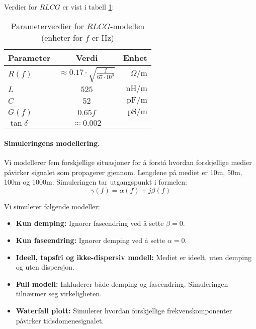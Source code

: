 \noindent Verdier for $RLCG$ er vist i tabell \ref{tab:parameters}: \\
\begin{table}[htbp] %
    \centering %
    
    \label{tab:my_table} %

    \begin{tabular}{l c r} %
        \toprule %
        Parameter & Verdi & Enhet\\ %
        \midrule %
         $R(f)$ & $\approx 0.17 \cdot \sqrt{\frac{f}{67 \cdot 10^3}}$ &  $\Omega / \mathrm{m}$ \\[.3em]
         $L$ & $525$ & $\mathrm{nH/m}$ \\[.3em]
         $C$ & $52$ & $\mathrm{pF/m}$ \\[.3em]
         $G(f)$ & $0.65f$ &  $\mathrm{pS/m}$ \\[.3em]
         $\tan \delta$ & $\approx 0.002$ &  $--$ \\[.3em]
        \bottomrule %
    \end{tabular}
    \caption{Parameterverdier for $RLCG$-modellen (enheter for $f$ er Hz)} %
    \label{tab:parameters} %
\end{table}
\paragraph{Simuleringens modellering.}
Vi modellerer fem forskjellige situasjoner for å forstå hvordan forskjellige medier påvirker signalet som propagerer gjennom. Lengdene på mediet er 10m, 50m, 100m og 1000m. Simuleringen tar utgangspunkt i formelen:
\[
\gamma (f) = \alpha(f) + j\beta(f)
\]

\noindent Vi simulerer følgende modeller:\\
\begin{itemize}
    \item \textbf{Kun demping:} Ignorer faseendring ved å sette $\beta = 0$.\\
    \item \textbf{Kun faseendring:} Ignorer demping ved å sette $\alpha = 0$.\\
    \item \textbf{Ideell, tapsfri og ikke-dispersiv modell:} Mediet er ideelt, uten demping og uten dispersjon.\\
    \item \textbf{Full modell:} Inkluderer både demping og faseendring. Simuleringen tilnærmer seg virkeligheten.\\
    \item \textbf{Waterfall plott:} Simulerer hvordan forskjellige frekvenskomponenter påvirker tidsdomenesignalet.\\
\end{itemize}

